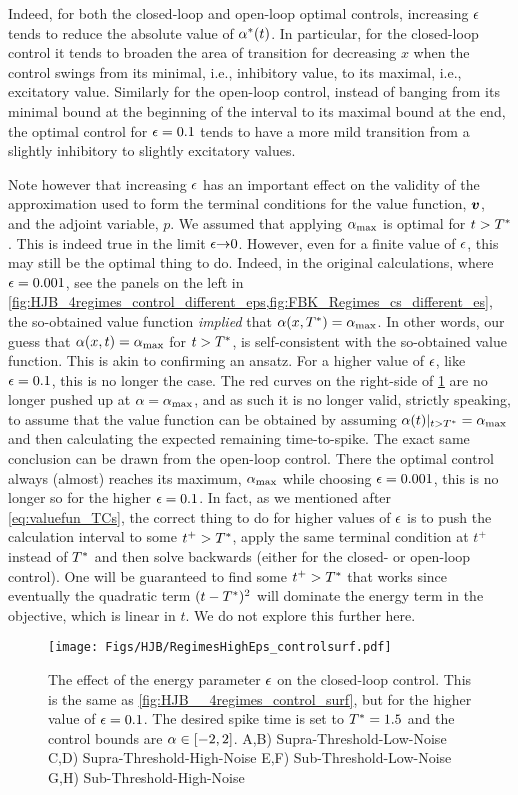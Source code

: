 Indeed, for both the closed-loop and open-loop optimal controls, increasing
${\epsilon}$ tends to reduce the absolute value of $\alpha^*(t)$. In particular, for the
closed-loop control it tends to broaden the area of transition for decreasing
$x$ when the control swings from its minimal, i.e., inhibitory value, to its
maximal, i.e., excitatory value. Similarly for the open-loop control, instead of
banging from its minimal bound at the beginning of the interval to its maximal
bound at the end, the optimal control for ${\epsilon} = 0.1$ tends to have a more mild
transition from a slightly inhibitory to slightly excitatory values.
  
Note however that increasing ${\epsilon}$ has an important effect on the validity of
the approximation used to form the terminal conditions for the value function,
${ \boldsymbol{v} }$, and the adjoint variable, $p$. We assumed that applying ${ \alpha_{\textrm{max}} }$ is optimal
for $t>{ T^* }$. This is indeed true in the limit ${\epsilon} {\rightarrow} 0$. However, even for a
finite value of ${\epsilon}$, this may still be the optimal thing to do. Indeed, in
the original calculations, where ${\epsilon}=0.001$, see the panels on the left in
\cref{fig:HJB_4regimes_control_different_eps,fig:FBK_Regimes_cs_different_es},
the so-obtained value function {\sl implied} that $\alpha(x,{ T^* }) = { \alpha_{\textrm{max}} }$. In other
words, our guess that $\alpha(x, t) = { \alpha_{\textrm{max}} }$ for $t > { T^* }$, is self-consistent with
the so-obtained value function. This is akin to confirming an ansatz. For a
higher value of ${\epsilon}$, like ${\epsilon} = 0.1$, this is no longer the case. The red
curves on the right-side of \cref{fig:HJB_4regimes_control_different_eps} are no
longer pushed up at $\alpha = { \alpha_{\textrm{max}} }$, and as such it is no longer valid, strictly
speaking, to assume that the value function can be obtained by assuming
$\alpha(t)|_{t>{ T^* }} = { \alpha_{\textrm{max}} }$ and then calculating the expected remaining
time-to-spike. The exact same conclusion can be drawn from the open-loop
control. There the optimal control always (almost) reaches its maximum, ${ \alpha_{\textrm{max}} }$
while choosing ${\epsilon} = 0.001$, this is no longer so for the higher ${\epsilon} = 0.1$.
In fact, as we mentioned after \cref{eq:valuefun_TCs}, the correct thing to do
for higher values of ${\epsilon}$ is to push the calculation interval to some $t^+ >
{ T^* }$, apply the same terminal condition at $t^+$ instead of ${ T^* }$ and then solve
backwards (either for the closed- or open-loop control). One will be guaranteed
to find some $t^+ > { T^* }$ that works since eventually the quadratic term
$(t-{ T^* })^2$ will dominate the energy term in the objective, which is linear in
$t$. We do not explore this further here.
\begin{figure}[htp]
\begin{center}
  \texttt{[image: Figs/HJB/RegimesHighEps\_controlsurf.pdf]}
  \caption[labelInTOC]{The effect of the energy parameter ${\epsilon}$ on the
  closed-loop control. This is the same as \cref{fig:HJB__4regimes_control_surf}, but for
  the higher value of ${\epsilon} = 0.1$.
  The desired spike time is set to
  ${ T^* }=1.5$ and the control bounds are $\alpha \in [-2,2]$. 
  A,B)
   Supra-Threshold-Low-Noise 
  C,D) 
   Supra-Threshold-High-Noise 
  E,F)
   Sub-Threshold-Low-Noise 
  G,H)
   Sub-Threshold-High-Noise}
\label{fig:HJB_4regimes_control_different_eps} 
\end{center}
\end{figure}
